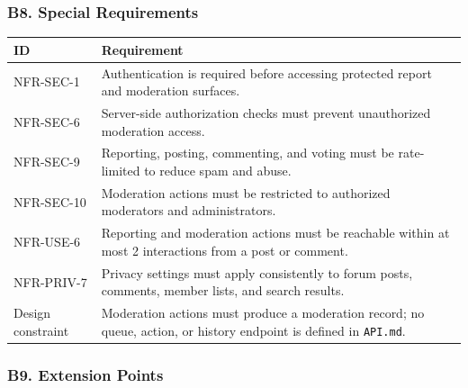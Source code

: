 \documentclass[12pt]{article}
\renewcommand{\baselinestretch}{1.5}
\begin{document}
\hypertarget{sec:b8-special-requirements}{}
\subsubsection*{B8. Special Requirements}
\par\medskip

\begingroup
\small
\renewcommand{\baselinestretch}{1.0}\selectfont
\renewcommand{\arraystretch}{1.15}
\setlength{\tabcolsep}{6pt}
\begin{longtable}{|>{\raggedright\arraybackslash}p{}|>{\raggedright\arraybackslash}p{}|}
\hline
\textbf{ID} & \textbf{Requirement} \\ \hline
\endhead
NFR-SEC-1 & Authentication is required before accessing protected report and moderation surfaces. \\ \hline
NFR-SEC-6 & Server-side authorization checks must prevent unauthorized moderation access. \\ \hline
NFR-SEC-9 & Reporting, posting, commenting, and voting must be rate-limited to reduce spam and abuse. \\ \hline
NFR-SEC-10 & Moderation actions must be restricted to authorized moderators and administrators. \\ \hline
NFR-USE-6 & Reporting and moderation actions must be reachable within at most 2 interactions from a post or comment. \\ \hline
NFR-PRIV-7 & Privacy settings must apply consistently to forum posts, comments, member lists, and search results. \\ \hline
Design constraint & Moderation actions must produce a moderation record; no queue, action, or history endpoint is defined in \texttt{API.md}. \\ \hline
\end{longtable}
\endgroup
\par\medskip

\hypertarget{sec:b9-extension-points}{}
\subsubsection*{B9. Extension Points}
\par\medskip
\end{document}
